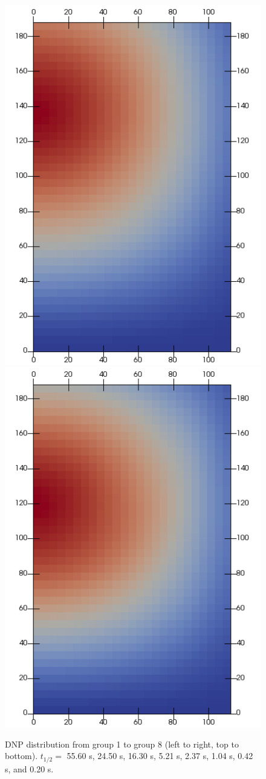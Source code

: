 \begin{frame}
\begin{figure}
		 	\includegraphics[width=.2\textwidth]{./images/pre7}
		 	\includegraphics[width=.2\textwidth]{./images/pre8}
		 	\caption{\footnotesize \gls{DNP} distribution
		 	from group 1 to group 8 (left to right, top to bottom). $t_{1/2} =$
		 	55.60 s, 24.50 s, 16.30 s, 5.21 s, 2.37 s, 1.04 s, 0.42 s, and
		 	0.20 s.}
		 	\label{fig:dnp}
		 \end{figure}
\end{frame}
